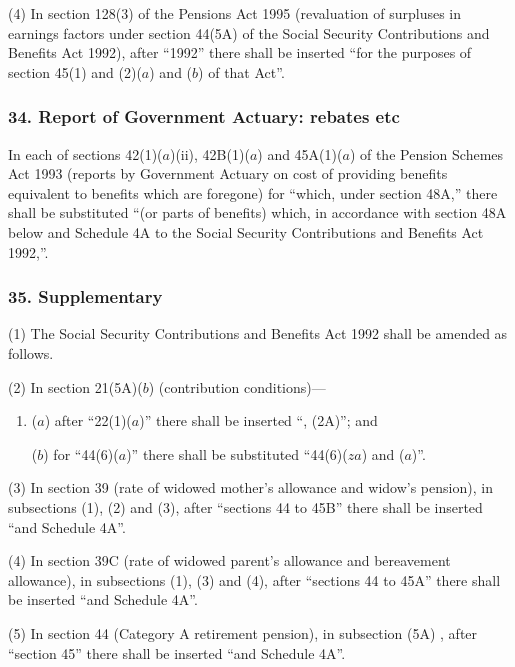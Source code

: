 \documentclass[12pt,a4paper]{article}
\begin{document}
(4) In section 128(3)  of the Pensions Act 1995 (revaluation of surpluses in earnings factors under section 44(5A)  of the Social Security Contributions and Benefits Act 1992), after “1992” there shall be inserted “for the purposes of section 45(1)  and (2)($a$)  and ($b$)  of that Act”.


\subsubsection{34. Report of Government Actuary: rebates etc}

In each of sections 42(1)($a$)(ii), 42B(1)($a$)  and 45A(1)($a$)  of the Pension Schemes Act 1993 (reports by Government Actuary on cost of providing benefits equivalent to benefits which are foregone) for “which, under section 48A,” there shall be substituted “(or parts of benefits) which, in accordance with section 48A below and Schedule 4A to the Social Security Contributions and Benefits Act 1992,”.


\subsubsection{35. Supplementary}

(1) The Social Security Contributions and Benefits Act 1992 shall be amended as follows.

(2) In section 21(5A)($b$)  (contribution conditions)—
\begin{enumerate}\item[]
($a$) after “22(1)($a$)” there shall be inserted “, (2A)”; and

($b$) for “44(6)($a$)” there shall be substituted “44(6)($za$)  and ($a$)”.
\end{enumerate}

(3) In section 39 (rate of widowed mother’s allowance and widow’s pension), in subsections (1), (2)  and (3), after “sections 44 to 45B” there shall be inserted “and Schedule 4A”.

(4) In section 39C (rate of widowed parent’s allowance and bereavement allowance), in subsections (1), (3)  and (4), after “sections 44 to 45A” there shall be inserted “and Schedule 4A”.

(5) In section 44 (Category A retirement pension), in subsection (5A) , after “section 45” there shall be inserted “and Schedule 4A”.
\end{document}
